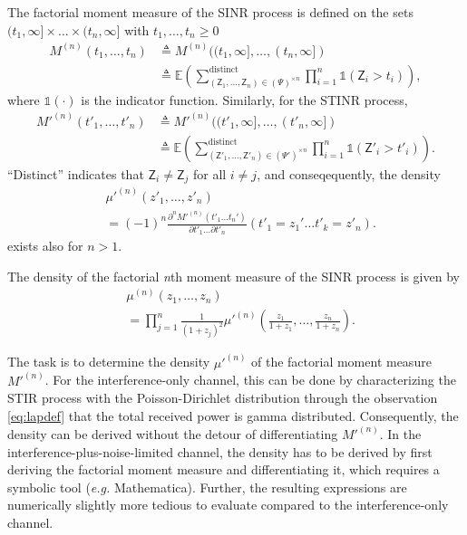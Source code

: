 \documentclass[lettersize,journal]{IEEEtran}
\begin{document}
The factorial moment measure of the SINR process is defined on the sets $(t_1,\infty] \times \dots \times (t_n, \infty]$ with $t_1,\dots,t_n\geq 0$
    \begin{align}
      M^{(n)}(t_1,\dots,t_n) &\triangleq M^{(n)}((t_1,\infty],\dots,(t_n,\infty]) \nonumber \\
          & \triangleq \mathbb{E} \left( \sum^{\text{distinct}}_{\left(\mathsf{Z}_1, \dots, \mathsf{Z}_n \right) \in (\Psi)^{\times n}} \prod_{i=1}^n \mathds{1}(\mathsf{Z}_i >t_i)\right),
    \end{align}
    where $\mathds{1}(\cdot)$ is the indicator function. Similarly, for the STINR process,
    \begin{align}
          M'^{(n)}(t'_1,\dots,t'_n) &\triangleq M'^{(n)}((t'_1,\infty],\dots,(t'_n,\infty]) \nonumber \\
              &\triangleq \mathbb{E} \left( \sum^{\text{distinct}}_{\left(\mathsf{Z}'_1, \dots, \mathsf{Z}'_n \right) \in (\Psi')^{\times n}} \prod_{i=1}^n \mathds{1}(\mathsf{Z}'_i >t'_i)\right).
    \end{align}
    ``Distinct'' indicates that $\mathsf{Z}_i \neq \mathsf{Z}_j $ for all $i \neq j $, and conseqequently, the density 
    \begin{align}
      \label{eq:differatemomentmeasure}
      &{\mu'}^{(n)}(z'_1,\dots,z'_n) \nonumber\\
      &= (-1)^n \frac{\partial^n M'^{(n)}(t'_1\dots t_n')}{\partial t'_1 \dots \partial t'_n}(t'_1=z_1'\dots t'_k=z'_n).
    \end{align}
    exists also for $n>1$.

    The density of the factorial \textit{n}th moment measure of the SINR process is given by
    \begin{align}
      \label{eq:SIRjointprobability}
      &\mu^{(n)}(z_1,\dots,z_n) \nonumber\\
      &= \prod_{j=1}^n\frac{1}{(1+z_j)^2}\mu'^{(n)}\left(\frac{z_1}{1+z_1},\dots,\frac{z_n}{1+z_n}\right).
    \end{align}

    The task is to determine the density $\mu'^{(n)}$ of the factorial moment measure $M'^{(n)}$. For the interference-only channel, this can be done by characterizing the STIR process with the Poisson-Dirichlet distribution through the observation \eqref{eq:lapdef} that the total received power is gamma distributed. Consequently, the density can be derived without the detour of differentiating $M'^{(n)}$. In the interference-plus-noise-limited channel, the density has to be derived by first deriving the factorial moment measure and differentiating it, which requires a symbolic tool (\textit{e.g.} Mathematica). Further, the resulting expressions are numerically slightly more tedious to evaluate compared to the interference-only channel.
  
\end{document}
